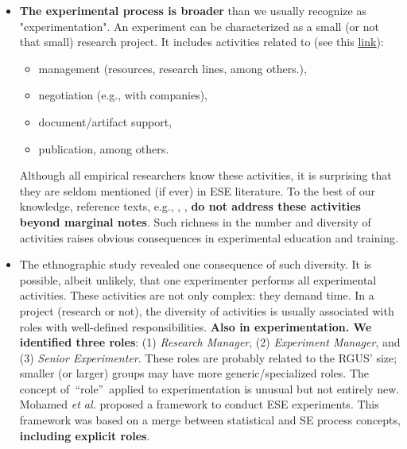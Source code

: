 \begin{itemize}
	\item \textbf{The experimental process is broader} than we usually recognize as "experimentation". An experiment can be characterized as a small (or not that small) research project. It includes activities related to (see this \href{https://zenodo.org/record/7105096#.YyxsxezMLUJ}{\ul{link}}):
		\begin{itemize}
			\item management (resources, research lines, among others.),
			\item negotiation (e.g., with companies), 
			\item document/artifact support, 
			\item publication, among others.
		\end{itemize}
Although all empirical researchers know these activities, it is surprising that they are seldom mentioned (if ever) in ESE literature. To the best of our knowledge, reference texts, e.g., \cite{Wohlin-2000-Experimentation-SE}, \cite{Juristo-2001-SE-experimentation}, \textbf{do not address these activities beyond marginal notes}. Such richness in the number and diversity of activities raises obvious consequences in experimental education and training.
	\item The ethnographic study revealed one consequence of such diversity. It is possible, albeit unlikely, that one experimenter performs all experimental activities. These activities are not only complex: they demand time. In a project (research or not), the diversity of activities is usually associated with roles with well-defined responsibilities. \textbf{Also in experimentation. We identified three roles}: (1) \textit{Research Manager}, (2) \textit{Experiment Manager}, and (3) \textit{Senior Experimenter}. These roles are probably related to the RGUS' size; smaller (or larger) groups may have more generic/specialized roles. The concept of~\textquotedblleft role\textquotedblright~applied to experimentation is unusual but not entirely new. Mohamed \textit{et al.} \cite{Mohamed-1993-roles-ESE} proposed a framework to conduct ESE experiments. This framework was based on a merge between statistical and SE process concepts, \textbf{including explicit roles}.

\end{itemize}

